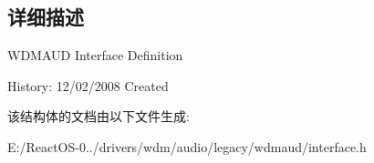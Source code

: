 \subsection{详细描述}
W\+D\+M\+A\+UD Interface Definition

History\+: 12/02/2008 Created 

该结构体的文档由以下文件生成\+:\begin{DoxyCompactItemize}
\item 
E\+:/\+React\+O\+S-\/0../drivers/wdm/audio/legacy/wdmaud/interface.\+h\end{DoxyCompactItemize}
